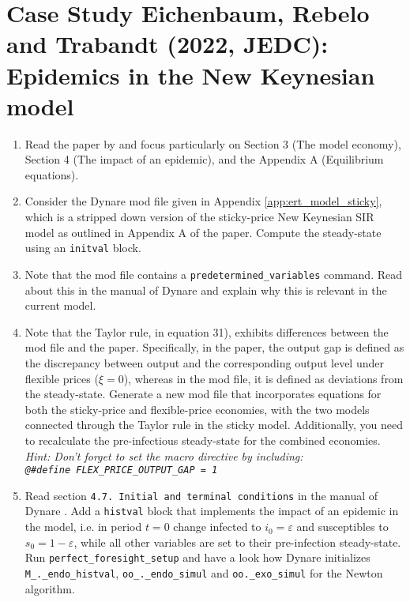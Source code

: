 \section[Case Study Eichenbaum, Rebelo and Trabandt (2022, JEDC): Epidemics in the New Keynesian model]{Case Study Eichenbaum, Rebelo and Trabandt (2022, JEDC): Epidemics in the New Keynesian model\label{ex:CaseStudy.Eichenbaum.Rebelo.Trabandt.2022}}

\begin{enumerate}
\item Read the paper by \textcite{Eichenbaum.Rebelo.Trabandt_2022_EpidemicsNewKeynesian}
  and focus particularly on Section 3 (The model economy), Section 4 (The impact of an epidemic), and the Appendix A (Equilibrium equations).

\item Consider the Dynare mod file given in Appendix \ref{app:ert_model_sticky}, which is a stripped down version of the sticky-price New Keynesian SIR model as outlined in Appendix A of the paper.
Compute the steady-state using an \texttt{initval} block.

\item Note that the mod file contains a \texttt{predetermined\_variables} command.
Read about this in the manual of Dynare \parencite{Adjemian.Bastani.Juillard.EtAl_2022_DynareReferenceManual}
  and explain why this is relevant in the current model.

\item Note that the Taylor rule, in equation 31), exhibits differences between the mod file and the paper.
Specifically, in the paper, the output gap is defined as the discrepancy between output and the corresponding output level under flexible prices ($\xi=0$),
  whereas in the mod file, it is defined as deviations from the steady-state.
Generate a new mod file that incorporates equations for both the sticky-price and flexible-price economies,
  with the two models connected through the Taylor rule in the sticky model.
Additionally, you need to recalculate the pre-infectious steady-state for the combined economies.
\emph{Hint: Don't forget to set the macro directive by including:\\ \texttt{@\#define FLEX\_PRICE\_OUTPUT\_GAP = 1}}

\item Read section \texttt{4.7. Initial and terminal conditions} in the manual of Dynare \parencite{Adjemian.Bastani.Juillard.EtAl_2022_DynareReferenceManual}.
Add a \texttt{histval} block that implements the impact of an epidemic in the model,
  i.e. in period $t=0$ change infected to $i_0=\varepsilon$ and susceptibles to $s_0=1-\varepsilon$,
  while all other variables are set to their pre-infection steady-state.
Run \texttt{perfect\_foresight\_setup} and have a look how Dynare initializes \texttt{M\_.\_endo\_histval},
  \texttt{oo\_.\_endo\_simul} and \texttt{oo.\_exo\_simul} for the Newton algorithm.


\end{enumerate}
